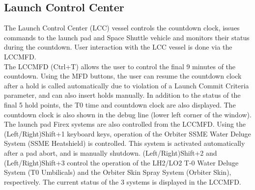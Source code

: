 \documentclass[Space_Shuttle_Vessel_Manual.tex]{subfiles}
\begin{document}
\begin{multicols*}{2}
\subsection{Launch Control Center}
\noindent
The Launch Control Center (LCC) vessel controls the countdown clock, issues commands to the launch pad and Space Shuttle vehicle and monitors their status during the countdown. User interaction with the LCC vessel is done via the LCCMFD.
\\
The LCCMFD (Ctrl+T) allows the user to control the final 9 minutes of the countdown. Using the MFD buttons, the user can resume the countdown clock after a hold is called automatically due to violation of a Launch Commit Criteria parameter, and can also insert holds manually. In addition to the status of the final 5 hold points, the T0 time and countdown clock are also displayed. The countdown clock is also shown in the debug line (lower left corner of the window).
\\
The launch pad Firex systems are also controlled from the LCCMFD. Using the (Left/Right)Shift+1 keyboard keys, operation of the Orbiter SSME Water Deluge System (SSME Heatshield) is controlled. This system is activated automatically after a pad abort, and is manually shutdown. (Left/Right)Shift+2 and (Left/Right)Shift+3 control the operation of the LH2/LO2 T-0 Water Deluge System (T0 Umbilicals) and the Orbiter Skin Spray System (Orbiter Skin), respectively. The current status of the 3 systems is displayed in the LCCMFD.
\end{multicols*}
\end{document}
